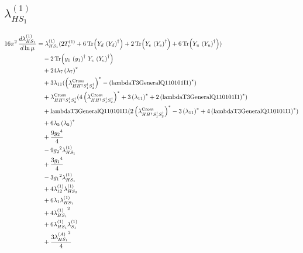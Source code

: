 \documentclass[10pt,a4paper]{article}
\begin{document}
\subsection*{$\lambda_{HS_1}^{(1)}$}
\begin{align*}
16\pi^2\,\frac{d \lambda_{HS_1}^{(1)}}{d\ln\mu} &={\lambda_{HS_1}^{(1)}} (2 T_{\nu}^{(1)}+6 \operatorname{Tr}\!\left({Y_d}\,\left({Y_d}\right)^{\dagger}\right)+2 \operatorname{Tr}\!\left({Y_e}\,\left({Y_e}\right)^{\dagger}\right)+6 \operatorname{Tr}\!\left({Y_u}\,\left({Y_u}\right)^{\dagger}\right)) \\
&\quad -2 \operatorname{Tr}\!\left({y_1}\,\left({y_1}\right)^{\dagger}\,{Y_e}\,\left({Y_e}\right)^{\dagger}\right) \\
&\quad +24 {\lambda_{7}} \left({\lambda_{7}}\right)^{*} \\
&\quad +3 {\lambda_{11}} (\left({\lambda_{H H^\dagger S_1^\dagger S_2^\dagger}^{\rm Cross}}\right)^{*}-\left(\text{lambdaT3GeneralQ110101I1}\right)^{*}) \\
&\quad +{\lambda_{H H^\dagger S_1^\dagger S_2^\dagger}^{\rm Cross}} (4 \left({\lambda_{H H^\dagger S_1^\dagger S_2^\dagger}^{\rm Cross}}\right)^{*}+3 \left({\lambda_{11}}\right)^{*}+2 \left(\text{lambdaT3GeneralQ110101I1}\right)^{*}) \\
&\quad +\text{lambdaT3GeneralQ110101I1} (2 \left({\lambda_{H H^\dagger S_1^\dagger S_2^\dagger}^{\rm Cross}}\right)^{*}-3 \left({\lambda_{11}}\right)^{*}+4 \left(\text{lambdaT3GeneralQ110101I1}\right)^{*}) \\
&\quad +6 {\lambda_5} \left({\lambda_5}\right)^{*} \\
&\quad +\frac{9 {g_2}^4}{4} \\
&\quad -9 {g_2}^2 {\lambda_{HS_1}^{(1)}} \\
&\quad +\frac{3 {g_1}^4}{4} \\
&\quad -3 {g_1}^2 {\lambda_{HS_1}^{(1)}} \\
&\quad +4 {\lambda_{12}^{(1)}} {\lambda_{HS_2}^{(1)}} \\
&\quad +6 {\lambda_1} {\lambda_{HS_1}^{(1)}} \\
&\quad +4 {\lambda_{HS_1}^{(1)}}^2 \\
&\quad +6 {\lambda_{HS_1}^{(1)}} {\lambda_{S_1}^{(1)}} \\
&\quad +\frac{3 {\lambda_{HS_1}^{(A)}}^2}{4} \\
\end{align*}
\end{document}
